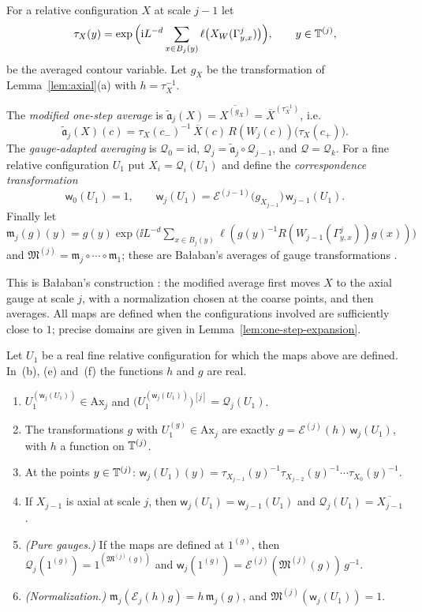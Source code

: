 For a relative configuration $X$ at scale $j-1$ let
\[
\tau_X(y)=\exp\Big(\mathrm i L^{-d}\sum_{x\in B_j(y)}\ell\big(X_W(\Gamma^j_{y,x})\big)\Big),\qquad y\in\mathbb T^{(j)},
\]
be the averaged contour variable. Let $g_X$ be the transformation of Lemma~\ref{lem:axial}(a) with $h=\tau_X^{-1}$.

\begin{definition}\label{def:adapted}
The \emph{modified one-step average} is $\tilde{\mathfrak a}_j(X)=\overline{X^{(g_X)}}=\overline X^{(\tau_X^{-1})}$, i.e.
\[
\tilde{\mathfrak a}_j(X)(c)=\tau_X(c_-)^{-1}\,\overline X(c)\,R(W_j(c))\big(\tau_X(c_+)\big).
\]
The \emph{gauge-adapted averaging} is $\mathcal Q_0=\mathrm{id}$, $\mathcal Q_j=\tilde{\mathfrak a}_j\circ\mathcal Q_{j-1}$, and $\mathcal Q=\mathcal Q_k$. For a fine relative configuration $U_1$ put $X_i=\mathcal Q_i(U_1)$ and define the \emph{correspondence transformation}
\[
\mathsf w_0(U_1)=1,\qquad\mathsf w_j(U_1)=\mathcal E^{(j-1)}\big(g_{X_{j-1}}\big)\,\mathsf w_{j-1}(U_1).
\]
Finally let $\mathfrak m_j(g)(y)=g(y)\exp\big(\ii L^{-d}\sum_{x\in B_j(y)}\ell(g(y)^{-1}R(W_{j-1}(\Gamma^j_{y,x}))g(x))\big)$ and $\mathfrak M^{(j)}=\mathfrak m_j\circ\cdots\circ\mathfrak m_1$; these are Ba\l aban's averages of gauge transformations \cite[(78)--(80)]{BalAvg}.
\end{definition}

This is Ba\l aban's construction \cite[(58)--(63), (88)--(92)]{BalAvg}: the modified average first moves $X$ to the axial gauge at scale $j$, with a normalization chosen at the coarse points, and then averages. All maps are defined when the configurations involved are sufficiently close to $1$; precise domains are given in Lemma~\ref{lem:one-step-expansion}.

\begin{theorem}[Correspondence]\label{thm:correspondence}
Let $U_1$ be a real fine relative configuration for which the maps above are defined. In~(b), (e) and~(f) the functions $h$ and $g$ are real.
\begin{enumerate}[label=(\alph*)]
\item $U_1^{(\mathsf w_j(U_1))}\in\mathrm{Ax}_j$ and $\big(U_1^{(\mathsf w_j(U_1))}\big)^{[j]}=\mathcal Q_j(U_1)$.
\item The transformations $g$ with $U_1^{(g)}\in\mathrm{Ax}_j$ are exactly $g=\mathcal E^{(j)}(h)\,\mathsf w_j(U_1)$, with $h$ a function on $\mathbb T^{(j)}$.
\item At the points $y\in\mathbb T^{(j)}$: $\mathsf w_j(U_1)(y)=\tau_{X_{j-1}}(y)^{-1}\tau_{X_{j-2}}(y)^{-1}\cdots\tau_{X_0}(y)^{-1}$.
\item If $X_{j-1}$ is axial at scale $j$, then $\mathsf w_j(U_1)=\mathsf w_{j-1}(U_1)$ and $\mathcal Q_j(U_1)=\overline{X_{j-1}}$.
\item \emph{(Pure gauges.)} If the maps are defined at $1^{(g)}$, then $\mathcal Q_j(1^{(g)})=1^{(\mathfrak M^{(j)}(g))}$ and $\mathsf w_j(1^{(g)})=\mathcal E^{(j)}(\mathfrak M^{(j)}(g))\,g^{-1}$.
\item \emph{(Normalization.)} $\mathfrak m_j(\mathcal E_j(h)g)=h\,\mathfrak m_j(g)$, and $\mathfrak M^{(j)}(\mathsf w_j(U_1))=1$.
\end{enumerate}
\end{theorem}


